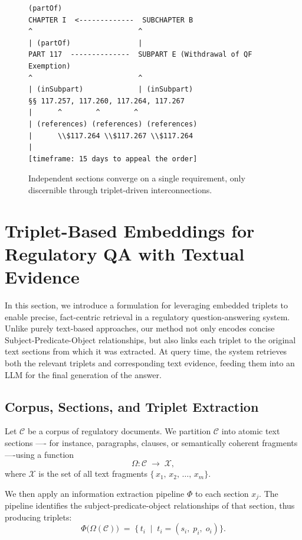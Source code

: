 \documentclass{article}
\begin{document}
\begin{figure}[h]
\centering
\begin{lstlisting}[basicstyle=\ttfamily\small, frame=single, numbers=none]
(partOf)
CHAPTER I  <-------------  SUBCHAPTER B
^                         ^
| (partOf)                |
PART 117  --------------  SUBPART E (Withdrawal of QF Exemption)
^                         ^
| (inSubpart)             | (inSubpart)
§§ 117.257, 117.260, 117.264, 117.267
|      ^        ^        ^
| (references) (references) (references)
|      \\$117.264 \\$117.267 \\$117.264
|
[timeframe: 15 days to appeal the order]
\end{lstlisting}
\caption{Independent sections converge on a single requirement, only discernible through triplet-driven interconnections.}
\label{fig:ontology_free_schematic}
\end{figure}



\section{Triplet-Based Embeddings for Regulatory QA with Textual Evidence}

In this section, we introduce a formulation for leveraging embedded triplets to enable precise, fact-centric retrieval in a regulatory question-answering system. Unlike purely text-based approaches, our method not only encodes concise Subject-Predicate-Object relationships, but also links each triplet to the original text sections from which it was extracted. At query time, the system retrieves both the relevant triplets and corresponding text evidence, feeding them into an LLM for the final generation of the answer.
\subsection{Corpus, Sections, and Triplet Extraction}

Let $\mathcal{C}$ be a corpus of regulatory documents. We partition $\mathcal{C}$ into atomic text sections ---- for instance, paragraphs, clauses, or semantically coherent fragments ----using a function
\[
\Omega: \mathcal{C} \;\to\; \mathcal{X},
\]
where $\mathcal{X}$ is the set of all text fragments
\(\{\,x_{1},\,x_{2},\,\dots,\,x_{m}\}\).

We then apply an information extraction pipeline $\Phi$ to each section \(x_j\). The pipeline identifies the subject-predicate-object relationships of that section, thus producing triplets:
\[
\Phi\bigl(\Omega(\mathcal{C})\bigr)
\;=\;
\bigl\{\,
t_i
\;\mid\;
t_i = (s_i,\; p_i,\; o_i)
\bigr\}.
\]
\end{document}
